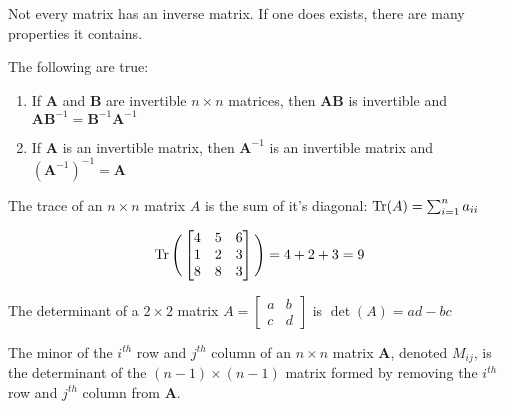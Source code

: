     Not every matrix has an inverse matrix. If one
    does exists, there are many properties it contains.
    \begin{theorem}
        The following are true:
        \begin{enumerate}
            \item If $\mathbf{A}$ and $\mathbf{B}$
                are invertible ${n}\times{n}$ matrices,
                then $\mathbf{A}\mathbf{B}$ is invertible
                and
                $\mathbf{A}\mathbf{B}^{-1}%
                 =\mathbf{B}^{-1}\mathbf{A}^{-1}$
            \item If $\mathbf{A}$ is an invertible matrix,
                then $\mathbf{A}^{-1}$ is an invertible
                matrix and
                $(\mathbf{A}^{-1})^{-1}=\mathbf{A}$
        \end{enumerate}
    \end{theorem}
    \begin{definition}
        The trace of an ${n}\times{n}$ matrix
        $A$ is the sum of
        it's diagonal: $\operatorname{Tr}(A)=\sum_{i=1}^{n}a_{ii} $
    \end{definition}
    \begin{example}
        \begin{equation*}
            \operatorname{Tr}\Bigg(
            \begin{bmatrix}
                4&5&6\\
                1&2&3\\
                8&8&3
            \end{bmatrix}
            \Bigg)
            =4+2+3=9
        \end{equation*}
    \end{example}
    \begin{definition}
        The determinant of a ${2}\times{2}$ matrix
        $A=%
         \begin{bmatrix}%
            a&b\\%
            c&d%
         \end{bmatrix}$
        is $\det(A)=ad-bc$
    \end{definition}
    \begin{definition}
        The minor of the $i^{th}$ row and $j^{th}$
        column of an ${n}\times{n}$ matrix $\mathbf{A}$,
        denoted $M_{ij}$, is the determinant of the
        ${(n-1)}\times{(n-1)}$ matrix formed by
        removing the $i^{th}$ row and $j^{th}$ column
        from $\mathbf{A}$.
    \end{definition}
